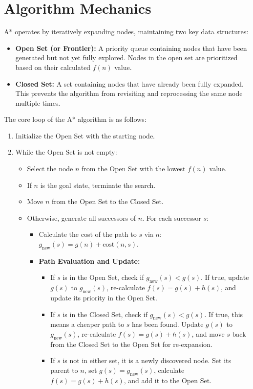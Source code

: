 \section{Algorithm Mechanics}
A* operates by iteratively expanding nodes, maintaining two key data structures:

\begin{itemize}
    \item \textbf{Open Set (or Frontier):} A priority queue containing nodes that have been generated but not yet fully explored. Nodes in the open set are prioritized based on their calculated $f(n)$ value.
    \item \textbf{Closed Set:} A set containing nodes that have already been fully expanded. This prevents the algorithm from revisiting and reprocessing the same node multiple times.
\end{itemize}

The core loop of the A* algorithm is as follows:
\begin{enumerate}
    \item Initialize the Open Set with the starting node.
    \item While the Open Set is not empty:
    \begin{itemize}
        \item Select the node $n$ from the Open Set with the lowest $f(n)$ value.
        \item If $n$ is the goal state, terminate the search.
        \item Move $n$ from the Open Set to the Closed Set.
        \item Otherwise, generate all successors of $n$. For each successor $s$:
        \begin{itemize}
            \item Calculate the cost of the path to $s$ via $n$: $g_{\text{new}}(s) = g(n) + \text{cost}(n, s)$.
            \item \textbf{Path Evaluation and Update:}
            \begin{itemize}
                \item If $s$ is in the Open Set, check if $g_{\text{new}}(s) < g(s)$. If true, update $g(s)$ to $g_{\text{new}}(s)$, re-calculate $f(s) = g(s) + h(s)$, and update its priority in the Open Set.
                \item If $s$ is in the Closed Set, check if $g_{\text{new}}(s) < g(s)$. If true, this means a cheaper path to $s$ has been found. Update $g(s)$ to $g_{\text{new}}(s)$, re-calculate $f(s) = g(s) + h(s)$, and move $s$ back from the Closed Set to the Open Set for re-expansion.
                \item If $s$ is not in either set, it is a newly discovered node. Set its parent to $n$, set $g(s) = g_{\text{new}}(s)$, calculate $f(s) = g(s) + h(s)$, and add it to the Open Set.
            \end{itemize}
        \end{itemize}
    \end{itemize}
\end{enumerate}

